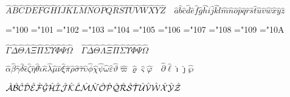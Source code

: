 \styletest\roottest

\def\\#1{#1{o}\interspace}\filltrial
\def\\#1{#1{A + \cdots - Q - \cdots + g}\interspace}\filltrial

\def\\#1{- #1A + #1q}\accenttrial




$
\hat{A}\hat{B}\hat{C}\hat{D}\hat{E}\hat{F}\hat{G}\hat{H}
\hat{I}\hat{J}\hat{K}\hat{L}\hat{M}\hat{N}\hat{O}\hat{P}
\hat{Q}\hat{R}\hat{S}\hat{T}\hat{U}\hat{V}\hat{W}\hat{X}
\hat{Y}\hat{Z}
%
\quad
%
\hat{a}\hat{b}\hat{c}\hat{d}\hat{e}\hat{f}\hat{g}\hat{h}
\hat{i}\hat{j}\hat{k}\hat{l}\hat{m}\hat{n}\hat{o}\hat{p}
\hat{q}\hat{r}\hat{s}\hat{t}\hat{u}\hat{v}\hat{w}\hat{x}
\hat{y}\hat{z}
$

\mathchardef\varGamma="100 \mathchardef\varDelta="101
\mathchardef\varTheta="102 \mathchardef\varLambda="103 \mathchardef\varXi="104
\mathchardef\varPi="105 \mathchardef\varSigma="106 \mathchardef\varUpsilon="107
\mathchardef\varPhi="108 \mathchardef\varPsi="109 \mathchardef\varOmega="10A


$
\hat{\Gamma}\hat{\Delta}\hat{\Theta}\hat{\Lambda}\hat{\Xi}\hat{\Pi}
\hat{\Sigma}\hat{\Upsilon}\hat{\Phi}\hat{\Psi}\hat{\Omega}
%
\quad
%
\hat{\varGamma}\hat{\varDelta}\hat{\varTheta}\hat{\varLambda}\hat{\varXi}\hat{\varPi}
\hat{\varSigma}\hat{\varUpsilon}\hat{\varPhi}\hat{\varPsi}\hat{\varOmega}
$

$
\hat{\alpha}\hat{\beta}\hat{\gamma}\hat{\delta}\hat{\epsilon}\hat{\zeta}
\hat{\eta}\hat{\theta}\hat{\iota}\hat{\kappa}\hat{\lambda}\hat{\mu}\hat{\nu}
\hat{\xi}\hat{\pi}\hat{\rho}\hat{\sigma}\hat{\tau}\hat{\upsilon}\hat{\phi}
\hat{\chi}\hat{\psi}\hat{\omega}\hat{\varepsilon}\hat{\vartheta}\hat{\varpi}
\hat{\varrho}\hat{\varsigma}\hat{\varphi}
%
\quad
%
\hat{\partial}\hat{\ell}\hat{\imath}\hat{\jmath}\hat{\wp}
$

$
\hat{{\cal A}}\hat{{\cal B}}\hat{{\cal C}}\hat{{\cal D}}\hat{{\cal E}}
\hat{{\cal F}}\hat{{\cal G}}\hat{{\cal H}}\hat{{\cal I}}\hat{{\cal J}}
\hat{{\cal K}}\hat{{\cal L}}\hat{{\cal M}}\hat{{\cal N}}\hat{{\cal O}}
\hat{{\cal P}}\hat{{\cal Q}}\hat{{\cal R}}\hat{{\cal S}}\hat{{\cal T}}
\hat{{\cal U}}\hat{{\cal V}}\hat{{\cal W}}\hat{{\cal X}}\hat{{\cal Y}}
\hat{{\cal Z}}
$

